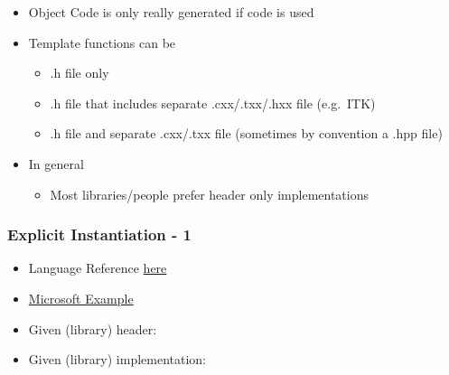 \begin{itemize}
\itemsep1pt\parskip0pt
\item
  Object Code is only really generated if code is used
\item
  Template functions can be

  \begin{itemize}
  \itemsep1pt\parskip0pt
  \item
    .h file only
  \item
    .h file that includes separate .cxx/.txx/.hxx file (e.g.~ITK)
  \item
    .h file and separate .cxx/.txx file (sometimes by convention a .hpp
    file)
  \end{itemize}
\item
  In general

  \begin{itemize}
  \itemsep1pt\parskip0pt
  \item
    Most libraries/people prefer header only implementations
  \end{itemize}
\end{itemize}

\subsubsection{Explicit Instantiation -
1}\label{explicit-instantiation---1}

\begin{itemize}
\item
  Language Reference
  \href{http://en.cppreference.com/w/cpp/language/function_template}{here}
\item
  \href{http://msdn.microsoft.com/en-us/library/by56e477\%28VS.80\%29.aspx}{Microsoft
  Example}
\item
  Given (library) header:
\end{itemize}

\begin{Shaded}
\begin{Highlighting}[]
 \NormalTok{<}  
\end{Highlighting}
\end{Shaded}

\begin{itemize}
\itemsep1pt\parskip0pt
\item
  Given (library) implementation:
\end{itemize}

